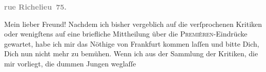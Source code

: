 \begin{ledgroupsized}[t]{13cm}
           \pstart
           \begin{otherlanguage}{french}\textcolor{gray}{\textbf{\textbf{rue Richelieu 75.}}}\end{otherlanguage}\pend
           \pstart\center{}Mein lieber Freund!\pend\pstart
           Nachdem ich bisher vergeblich auf die verſprochenen Kritiken oder wenigſtens auf eine
               briefliche Mittheilung über die \textsc{Premièren}-Eindrücke
               gewartet, habe ich mir das Nöthige von Frankfurt
               kommen laſſen und bitte Dich, Dich nun nicht mehr zu bemühen.\pend
           \pstart
           Wenn ich aus der Sammlung der Kritiken, die mir vorliegt, die dummen Jungen weglaſſe

\end{ledgroupsized}
